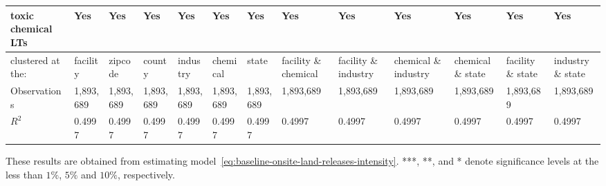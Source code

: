 \begin{table}[H]
{\begin{tabular}{@{}lllllllllllll@{}}
            toxic chemical LTs                         & Yes       & Yes       & Yes       & Yes       & Yes       & Yes       & Yes                  & Yes                  & Yes                  & Yes               & Yes               & Yes               \\\midrule
            clustered at the:                          & facility  & zipcode   & county    & industry  & chemical  & state     & facility \& chemical & facility \& industry & chemical \& industry & chemical \& state & facility \& state & industry \& state \\
            Observations                               & 1,893,689 & 1,893,689 & 1,893,689 & 1,893,689 & 1,893,689 & 1,893,689 & 1,893,689            & 1,893,689            & 1,893,689            & 1,893,689         & 1,893,689         & 1,893,689         \\
            $R^2$                                      & 0.4997    & 0.4997    & 0.4997    & 0.4997    & 0.4997    & 0.4997    & 0.4997               & 0.4997               & 0.4997               & 0.4997            & 0.4997            & 0.4997            \\ \bottomrule\bottomrule
        \end{tabular}%
    }
    \begin{minipage}{18cm}
        \vspace{0.05in}
        These results are obtained from estimating model~\ref{eq:baseline-onsite-land-releases-intensity}. ***, **, and * denote significance levels at the less than $1\%$, $5\%$ and $10\%$, respectively.
    \end{minipage}
\end{table}